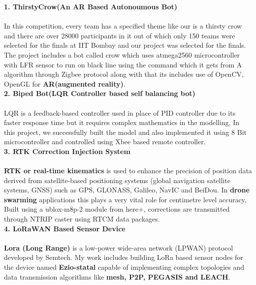 \documentclass[10pt]{report}
\begin{document}
\noindent\textbf{\large 1. ThirstyCrow(An AR Based Autonoumous Bot)\\[1pt]}
\\In this competition, every team has a specified theme like our is a thirsty crow and there are over 28000 participants in it out of which only 150 teams were selected for the finals at IIT Bombay and our project was selected for the finals. The project includes a bot called crow which uses atmega2560 microcontroller with LFR sensor to run on black line using the command which it gets from A\* algorithm through Zigbee protocol along with that its includes use of OpenCV, OpenGL for \textbf{AR(augmented reality)}.
\\[2pt] 

\noindent\textbf{\large 2. Biped Bot(LQR Controller based self balancing bot)\\[1pt]}
\\LQR is a feedback-based controller used in place of PID controller due to its faster response time but it requires complex mathematics in the modelling, In this project, we successfully built the model and also implemented it using 8 Bit microcontroller and controlled using Xbee based remote controller.
\\[1pt] 

\noindent\textbf{\large 3. RTK Correction Injection System\\[1pt]}
\\\textbf{RTK or real-time kinematics} is used to enhance the precision of position data derived from satellite-based positioning systems (global navigation satellite systems, GNSS) such as GPS, GLONASS, Galileo, NavIC and BeiDou. In \textbf{drone swarming} applications this plays a very vital role for centimetre level accuracy, Built using a ublox-m8p-2 module from here+, corrections are transmitted through NTRIP caster using RTCM data packages.
\\[1pt]
 
\noindent\textbf{\large 4. LoRaWAN Based Sensor Device\\[1pt]}
\\\textbf{Lora (Long Range)} is a low-power wide-area network (LPWAN) protocol developed by Semtech. My work includes building LoRa based sensor nodes for the device named \textbf{Ezio-statal} capable of implementing complex topologies and data transmission algorithms like \textbf{mesh, P2P, PEGASIS and LEACH}. 
\\[1pt]
\end{document}

